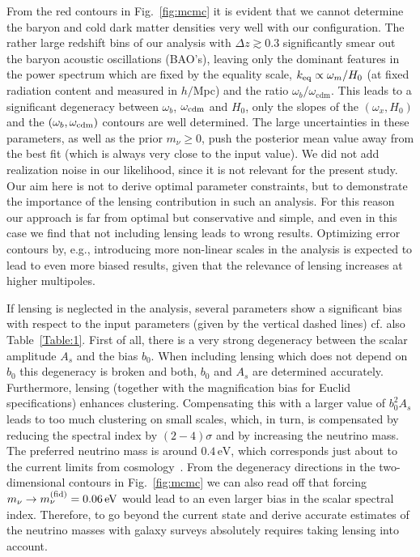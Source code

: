 From the red contours in Fig.~\ref{fig:mcmc} it is evident that we cannot determine the baryon and cold dark matter densities very well with our configuration. The rather large redshift bins of our analysis with $\Delta z\gtrsim 0.3$ significantly smear out the baryon acoustic oscillations (BAO's), leaving only the dominant features in the power spectrum which are fixed by the equality scale, $k_{\rm eq} \propto \omega_m/H_0$ (at fixed radiation content and measured in $h/$Mpc) and the ratio $\omega_b/\omega_{\mathrm{cdm}}$. This  leads to a significant  degeneracy between $\omega_b$, $\omega_{\rm cdm}$ and $H_0$, only the slopes of the $(\omega_x,H_0)$ and the $(\omega_b, \omega_{\rm cdm})$  contours are well determined. The large uncertainties in these parameters, as well as the prior $m_\nu\geq 0$, push the posterior mean value away from the best fit (which is always very close to the input value). We did not add realization noise in our likelihood, since it is not relevant for the present study.
Our aim here is not to derive optimal parameter constraints, but to demonstrate the importance of the lensing contribution in such an analysis. For this reason our approach is far from optimal but  conservative and simple, and even in this case we find that not including lensing leads to wrong results.
Optimizing error contours by, e.g., introducing more non-linear scales in the analysis is expected to lead to even more biased results, given  that  the relevance of lensing increases at higher multipoles.


If lensing is neglected in the analysis, several parameters
show a significant bias with respect to the input parameters (given by the vertical dashed lines)  cf. also Table~\ref{Table:1}.
First of all, there is a very strong degeneracy between the scalar amplitude $A_s$ and the bias $b_0$.  When including lensing which does not depend on $b_0$ this degeneracy is broken and both, $b_0$ and $A_s$ are determined accurately. Furthermore, lensing (together with the magnification bias for Euclid specifications) enhances clustering. Compensating this with a larger value of $b_0^2A_s$ leads to too much clustering on small scales, which, in turn, is compensated by reducing the spectral index by $(2-4)\sigma$ and by increasing the neutrino mass.   The preferred neutrino mass
is around $0.4\, \mathrm{eV}$, which corresponds just about to the current limits from cosmology~\cite{Ade:2015xua}.
From the degeneracy directions in the two-dimensional contours in Fig.~\ref{fig:mcmc}
we can also read off that forcing $m_\nu \rightarrow m_\nu^{\rm (fid)} = 0.06\, \mathrm{eV}$ would lead to
an even larger bias in the scalar spectral index.
Therefore, to go beyond the current state and derive accurate estimates of the neutrino masses with galaxy surveys absolutely requires taking lensing into account.

